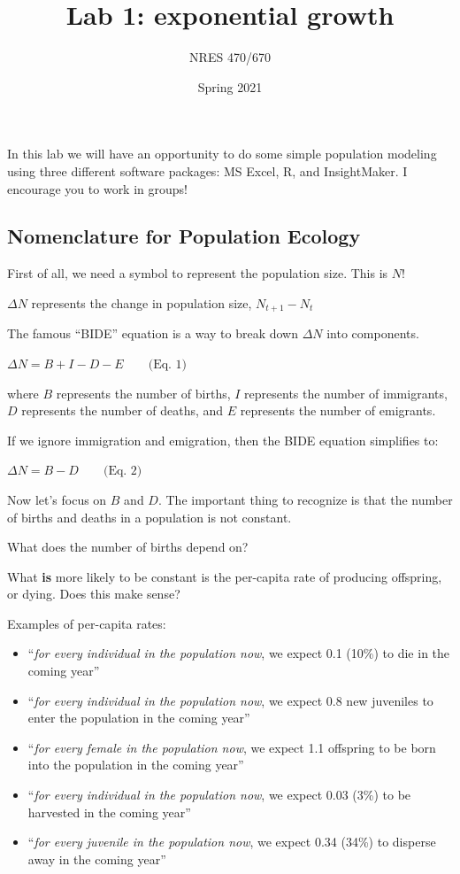 \documentclass[
]{article}
\title{Lab 1: exponential growth}
\author{NRES 470/670}
\date{Spring 2021}
\providecommand{\tightlist}{%
  \setlength{\itemsep}{0pt}\setlength{\parskip}{0pt}}
\begin{document}
\maketitle

{
\setcounter{tocdepth}{2}
\tableofcontents
}
In this lab we will have an opportunity to do some simple population
modeling using three different software packages: MS Excel, R, and
InsightMaker. I encourage you to work in groups!

\hypertarget{nomenclature-for-population-ecology}{%
\subsection{Nomenclature for Population
Ecology}\label{nomenclature-for-population-ecology}}

First of all, we need a symbol to represent the population size. This is
\(N\)!

\(\Delta N\) represents the change in population size,
\({N_{t+1}}-{N_t}\)

The famous ``BIDE'' equation is a way to break down \(\Delta N\) into
components.

\(\Delta N = B + I - D - E \qquad \text{(Eq. 1)}\)

where \(B\) represents the number of births, \(I\) represents the number
of immigrants, \(D\) represents the number of deaths, and \(E\)
represents the number of emigrants.

If we ignore immigration and emigration, then the BIDE equation
simplifies to:

\(\Delta N = B - D \qquad \text{(Eq. 2)}\)

Now let's focus on \(B\) and \(D\). The important thing to recognize is
that the number of births and deaths in a population is not constant.

What does the number of births depend on?

What \textbf{is} more likely to be constant is the per-capita rate of
producing offspring, or dying. Does this make sense?

Examples of per-capita rates:

\begin{itemize}
\tightlist
\item
  ``\emph{for every individual in the population now}, we expect 0.1
  (10\%) to die in the coming year''
\item
  ``\emph{for every individual in the population now}, we expect 0.8 new
  juveniles to enter the population in the coming year''
\item
  ``\emph{for every female in the population now}, we expect 1.1
  offspring to be born into the population in the coming year''
\item
  ``\emph{for every individual in the population now}, we expect 0.03
  (3\%) to be harvested in the coming year''
\item
  ``\emph{for every juvenile in the population now}, we expect 0.34
  (34\%) to disperse away in the coming year''
\end{itemize}
\end{document}
